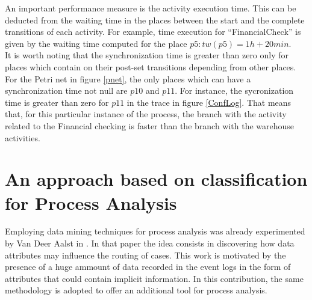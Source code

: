 \documentclass{llncs}
\begin{document}
An important performance measure is the activity execution time. This can be deducted from the waiting time in the places between the start and the complete transitions of each activity. For example, time execution for ``FinancialCheck'' is given by the waiting time computed for the place $p5: tw(p5)=1h+20min$.\\

It is worth noting that the synchronization time is greater than zero only for places which contain on their post-set transitions depending from other places. For the Petri net in figure \ref{pnet}, the only places which can have a synchronization time not null are $p10$ and $p11$. For instance, the sycronization time is greater than zero for $p11$ in the trace in figure \ref{ConfLog}. That means that, for this particular instance of the process, the branch with the activity related to the Financial checking is faster than the branch with the warehouse activities.

\section{An approach based on classification for Process Analysis}\label{ClassConformance}

 

Employing data mining techniques for process analysis was already experimented by Van Deer Aalst in \cite{decision mining in business process}. In that paper the idea consists in discovering how data attributes may influence the routing of cases. This work is motivated by the presence of a huge ammount of data recorded in the event logs in the form of attributes that could contain implicit information. In this contribution, the same methodology is adopted to offer an additional tool for process analysis.\\
\end{document}
